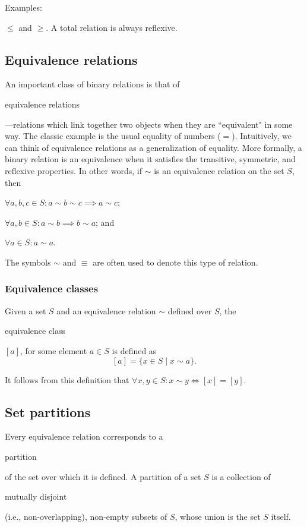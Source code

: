 \documentclass[11pt]{article}
\theoremstyle{plain}
\theoremstyle{definition}
\newenvironment{packed_items}{
\begin{itemize}
  \setlength{\itemsep}{1pt}
  \setlength{\parskip}{0pt}
  \setlength{\parsep}{0pt}
}{\end{itemize}}
\begin{document}
\noindent \begin{em}Examples:\end{em} $ \le $ and $ \ge $.
A total relation is always reflexive.

\subsection*{Equivalence relations}

An important class of binary relations is that of \begin{em}equivalence relations\end{em}---relations which link together two objects when they are ``equivalent" in some way.
The classic example is the usual equality of numbers ($ = $).
Intuitively, we can think of equivalence relations as a generalization of equality.
More formally, a binary relation is an equivalence when it satisfies the transitive, symmetric, and reflexive properties.
In other words, if $ \sim $ is an equivalence relation on the set $ S $, then
\begin{packed_items}
\item $ \forall a, b, c \in S : a \sim b \sim c \implies a \sim c $;
\item $ \forall a, b \in S : a \sim b \implies b \sim a $; and
\item $ \forall a \in S : a \sim a $.
\end{packed_items}

\noindent The symbols $ \sim $ and $ \equiv $ are often used to denote this type of relation.

\subsubsection*{Equivalence classes}

Given a set $ S $ and an equivalence relation $ \sim $ defined over $ S $, the \begin{em}equivalence class\end{em} $ [a] $, for some element $ a \in S $ is defined as
$$
  [a] = \{ x \in S \mid x \sim a \}.
$$

\noindent It follows from this definition that $ \forall x, y \in S : x \sim y \iff [x] = [y] $.

\subsection*{Set partitions}

Every equivalence relation corresponds to a \begin{em}partition\end{em} of the set over which it is defined. A partition of a set $ S $ is a collection of \begin{em}mutually disjoint\end{em} (i.e., non-overlapping), non-empty subsets of $ S $, whose union is the set $ S $ itself. \\
\end{document}
